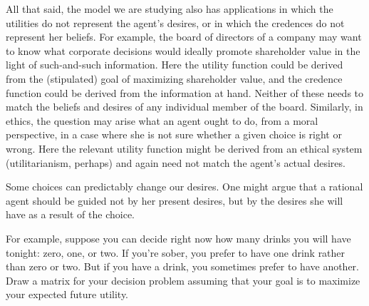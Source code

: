 



All that said, the model we are studying also has applications in
which the utilities do not represent the agent's desires, or in which
the credences do not represent her beliefs. For example, the board of
directors of a company may want to know what corporate decisions would
ideally promote shareholder value in the light of such-and-such
information. Here the utility function could be derived from the
(stipulated) goal of maximizing shareholder value, and the credence
function could be derived from the information at hand. Neither of
these needs to match the beliefs and desires of any individual member
of the board. Similarly, in ethics, the question may arise what an
agent ought to do, from a moral perspective, in a case where she is
not sure whether a given choice is right or wrong. Here the relevant
utility function might be derived from an ethical system
(utilitarianism, perhaps) and again need not match the agent's actual
desires.

\begin{exercise2}
  Some choices can predictably change our desires. One might argue that
  a rational agent should be guided not by her present desires, but by
  the desires she will have as a result of the choice.

  For example, suppose you can decide right now how many drinks you
  will have tonight: zero, one, or two. If you're sober, you prefer to
  have one drink rather than zero or two. But if you have a drink, you
  sometimes prefer to have another. Draw a matrix for your decision
  problem assuming that your goal is to maximize your expected future
  utility.
\end{exercise2}

